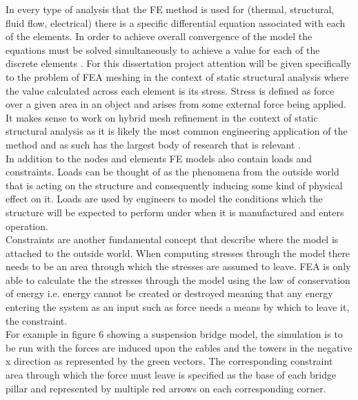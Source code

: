 \noindent
In every type of analysis that the FE method is used for (thermal, structural, fluid flow, electrical) there is a specific differential equation associated with each of the elements. In order to achieve overall convergence of the model the equations must be solved simultaneously to achieve a value for each of the discrete elements \cite{IntroductionToFE}. For this dissertation project attention will be given specifically to the problem of FEA meshing in the context of static structural analysis where the value calculated across each element is its stress. Stress is defined as force over a given area in an object and arises from some external force being applied. It makes sense to work on hybrid mesh refinement in the context of static structural analysis as it is likely the most common engineering application of the method and as such has the largest body of research that is relevant \cite{DolsakPaper94}\cite{IntroductionToFE}.\\

\noindent
In addition to the nodes and elements FE models also contain loads and constraints. Loads can be thought of as the phenomena from the outside world that is acting on the structure and consequently inducing some kind of physical effect on it. Loads are used by engineers to model the conditions which the structure will be expected to perform under when it is manufactured and enters operation. \\

\noindent
Constraints are another fundamental concept that describe where the model is attached to the outside world. When computing stresses through the model there needs to be an area through which the stresses are assumed to leave. FEA is only able to calculate the the stresses through the model using the law of conservation of energy i.e. energy cannot be created or destroyed meaning that any energy entering the system as an input such as force needs a means by which to leave it, the constraint. \\

\noindent
For example in figure 6 showing a suspension bridge model, the simulation is to be run with the forces are induced upon the cables and the towers in the negative x direction as represented by the green vectors. The corresponding constraint area through which the force must leave is specified as the base of each bridge pillar and represented by multiple red arrows on each corresponding corner.\\

